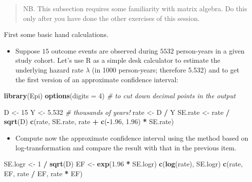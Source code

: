 \documentclass[
]{book}
\newenvironment{Shaded}{\begin{snugshade}}{\end{snugshade}}
\newcommand{\AttributeTok}[1]{\textcolor[rgb]{0.13,0.29,0.53}{#1}}
\newcommand{\CommentTok}[1]{\textcolor[rgb]{0.56,0.35,0.01}{\textit{#1}}}
\newcommand{\DecValTok}[1]{\textcolor[rgb]{0.00,0.00,0.81}{#1}}
\newcommand{\FloatTok}[1]{\textcolor[rgb]{0.00,0.00,0.81}{#1}}
\newcommand{\FunctionTok}[1]{\textcolor[rgb]{0.13,0.29,0.53}{\textbf{#1}}}
\newcommand{\NormalTok}[1]{#1}
\newcommand{\OtherTok}[1]{\textcolor[rgb]{0.56,0.35,0.01}{#1}}
\newcommand{\SpecialCharTok}[1]{\textcolor[rgb]{0.81,0.36,0.00}{\textbf{#1}}}
\providecommand{\tightlist}{%
  \setlength{\itemsep}{0pt}\setlength{\parskip}{0pt}}
\begin{document}
\begin{quote}
NB. This subsection requires some familiarity with matrix algebra. Do this only after you have done the other exercises of this session.
\end{quote}

First some basic hand calculations.

\begin{itemize}
\tightlist
\item
  Suppose \(15\) outcome events are observed during \(5532\) person-years in a given study cohort.
  Let's use R as a simple desk calculator to estimate the underlying hazard rate \(\lambda\) (in 1000
  person-years; therefore 5.532) and to get the first version of an approximate confidence
  interval:
\end{itemize}

\begin{Shaded}
\begin{Highlighting}[]
\FunctionTok{library}\NormalTok{(Epi)}
\FunctionTok{options}\NormalTok{(}\AttributeTok{digits =} \DecValTok{4}\NormalTok{) }\CommentTok{\#  to cut down decimal points in the output}
\end{Highlighting}
\end{Shaded}

\begin{Shaded}
\begin{Highlighting}[]
\NormalTok{D }\OtherTok{\textless{}{-}} \DecValTok{15}
\NormalTok{Y }\OtherTok{\textless{}{-}} \FloatTok{5.532} \CommentTok{\# thousands of years!}
\NormalTok{rate }\OtherTok{\textless{}{-}}\NormalTok{ D }\SpecialCharTok{/}\NormalTok{ Y}
\NormalTok{SE.rate }\OtherTok{\textless{}{-}}\NormalTok{ rate }\SpecialCharTok{/} \FunctionTok{sqrt}\NormalTok{(D)}
\FunctionTok{c}\NormalTok{(rate, SE.rate, rate }\SpecialCharTok{+} \FunctionTok{c}\NormalTok{(}\SpecialCharTok{{-}}\FloatTok{1.96}\NormalTok{, }\FloatTok{1.96}\NormalTok{) }\SpecialCharTok{*}\NormalTok{ SE.rate)}
\end{Highlighting}
\end{Shaded}

\begin{itemize}
\tightlist
\item
  Compute now the approximate confidence interval using the method
  based on log-transformation and compare the result with that in the previous item.
\end{itemize}

\begin{Shaded}
\begin{Highlighting}[]
\NormalTok{SE.logr }\OtherTok{\textless{}{-}} \DecValTok{1} \SpecialCharTok{/} \FunctionTok{sqrt}\NormalTok{(D)}
\NormalTok{EF }\OtherTok{\textless{}{-}} \FunctionTok{exp}\NormalTok{(}\FloatTok{1.96} \SpecialCharTok{*}\NormalTok{ SE.logr)}
\FunctionTok{c}\NormalTok{(}\FunctionTok{log}\NormalTok{(rate), SE.logr)}
\FunctionTok{c}\NormalTok{(rate, EF, rate }\SpecialCharTok{/}\NormalTok{ EF, rate }\SpecialCharTok{*}\NormalTok{ EF)}
\end{Highlighting}
\end{Shaded}
\end{document}
